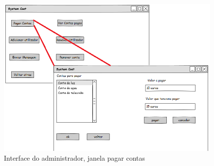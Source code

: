 \begin{figure}[h!]
	\centering
	\includegraphics[scale=0.6]{imagens/mockups/AdminpagarContas}  
	\caption{Interface do administrador, janela pagar contas }  
\end{figure}










